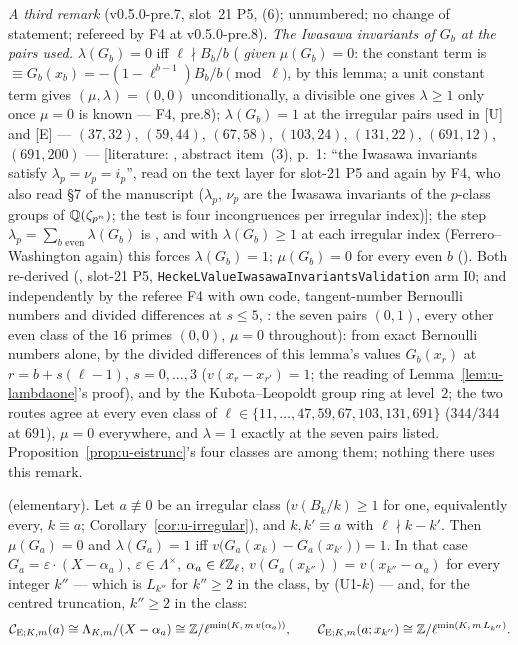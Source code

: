 \documentclass[11pt]{article}
\newcommand{\LIT}[1]{\textsf{[literature: #1]}}   %
\newcommand{\Iw}{\Lambda}                         %
\newcommand{\Eis}{\mathrm{E}}
\newcommand{\Cg}{\mathcal{C}}                     %
\newcommand{\Zl}{\Z_\ell}
\begin{document}
\noindent\emph{A third remark} (v0.5.0-pre.7, slot~21 P5, (6); unnumbered; no change of statement; refereed by F4 at v0.5.0-pre.8). \emph{The Iwasawa invariants of $G_b$ at the pairs used.}
$\lambda(G_b)=0$ iff $\ell\nmid B_b/b$ (\PROVED{} \emph{given} $\mu(G_b)=0$: the constant term is $\equiv G_b(x_b)=-(1-\ell^{b-1})B_b/b\pmod\ell$, by this lemma; a unit constant term gives $(\mu,\lambda)=(0,0)$
unconditionally, a divisible one gives $\lambda\ge1$ only once $\mu=0$ is known --- F4, pre.8); $\lambda(G_b)=1$ at the irregular pairs used in [U] and [E] ---
$(37,32)$, $(59,44)$, $(67,58)$, $(103,24)$, $(131,22)$, $(691,12)$, $(691,200)$ --- \LIT{\cite{hho}, abstract item~(3), p.~1: ``the Iwasawa invariants satisfy $\lambda_p=\nu_p=i_p$'', read on the text layer
for slot-21 P5 and again by F4, who also read \S7 of the manuscript ($\lambda_p$, $\nu_p$ are the Iwasawa invariants of the $p$-class groups of $\mathbb{Q}(\zeta_{p^{n}})$; the test is four incongruences per irregular index)}; the step
$\lambda_p=\sum_{b\text{ even}}\lambda(G_b)$ is ,
and with $\lambda(G_b)\ge1$ at each irregular index (Ferrero--Washington again) this forces $\lambda(G_b)=1$; $\mu(G_b)=0$ for every even $b$ (). Both re-derived (\COMP, slot-21 P5, \texttt{HeckeLValueIwasawaInvariantsValidation} arm I0; and independently by the referee F4 with own code, tangent-number Bernoulli numbers and divided
differences at $s\le5$, : the seven pairs $(0,1)$, every other even class of the $16$ primes $(0,0)$, $\mu=0$ throughout): from exact Bernoulli numbers alone, by the divided differences of this lemma's values
$G_b(x_r)$ at $r=b+s(\ell-1)$, $s=0,\dots,3$ ($v(x_r-x_{r'})=1$; the reading of Lemma~\ref{lem:u-lambdaone}'s proof), and by the Kubota--Leopoldt group ring at level~$2$; the two routes agree at every even
class of $\ell\in\{11,\dots,47,59,67,103,131,691\}$ ($344/344$ at $691$), $\mu=0$ everywhere, and $\lambda=1$ exactly at the seven pairs listed. Proposition~\ref{prop:u-eistrunc}'s four classes are among them;
nothing there uses this remark.

\begin{lemma}\label{lem:u-lambdaone}
\PROVED{} (elementary). Let $a\not\equiv0$ be an irregular class ($v(B_k/k)\ge1$ for one, equivalently every, $k\equiv a$; Corollary~\ref{cor:u-irregular}), and
$k,k'\equiv a$ with $\ell\nmid k-k'$. Then $\mu(G_a)=0$ and $\lambda(G_a)=1$ iff $v\bigl(G_a(x_k)-G_a(x_{k'})\bigr)=1$. In that case $G_a=\varepsilon\cdot(X-\alpha_a)$,
$\varepsilon\in\Iw^{\times}$, $\alpha_a\in\ell\Zl$, $v(G_a(x_{k''}))=v(x_{k''}-\alpha_a)$ for every integer $k''$ --- which is $L_{k''}$ for $k''\ge2$ in the class, by
(U1-$k$) --- and, for the centred truncation, $k''\ge2$ in the class:
\[
  \Cg_{\Eis;K,m}(a)\cong\Iw_{K,m}/(X-\alpha_a)\cong\Z/\ell^{\min(K,\,m\,v(\alpha_a))},\qquad
  \Cg_{\Eis;K,m}(a;x_{k''})\cong\Z/\ell^{\min(K,\,m\,L_{k''})}.
\]
\end{lemma}
\end{document}
